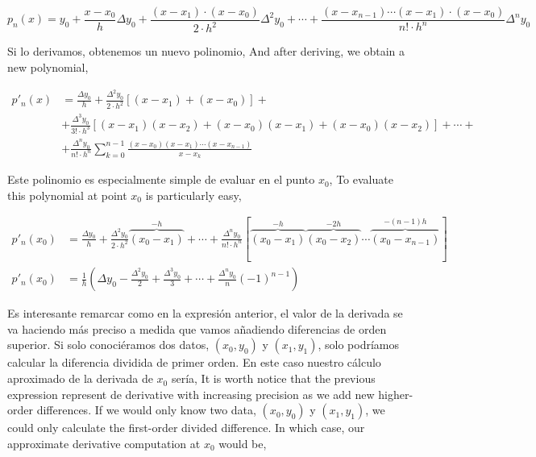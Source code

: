 \begin{equation*}
p_n(x)=y_0+\frac{x-x_0}{h}\Delta y_0+\frac{(x-x_1)\cdot (x-x_0)}{2\cdot h^2}\Delta^2 y_0+\cdots +\frac{(x-x_{n-1}) \cdots (x-x_1)\cdot (x-x_0)}{n! \cdot h^n}\Delta^n y_0
\end{equation*}
\begin{paracol}{2}
Si lo derivamos, obtenemos un nuevo polinomio,
\switchcolumn
And after deriving, we obtain a new polynomial,
\end{paracol}
\begin{align*}
p'_n(x)&=\frac{\Delta y_0}{h}+\frac{\Delta^2 y_0}{2\cdot h^2}\left[(x-x_1)+(x-x_0) \right] +\\
&+\frac{\Delta^3 y_0}{3! \cdot h^3}\left[(x-x_1)(x-x_2)+(x-x_0)(x-x_1)+(x-x_0)(x-x_2)\right]+\cdots +\\
&+\frac{\Delta^n y_0}{n! \cdot h^n}\sum_{k=0}^{n-1}\frac{(x-x_0)(x-x_1)\cdots (x-x_{n-1})}{x-x_k}
\end{align*}
\begin{paracol}{2}
Este polinomio es especialmente simple de evaluar en el punto $x_0$,
\switchcolumn
To evaluate this polynomial at point $x_0$ is particularly easy,
\end{paracol}
\begin{align*}
p'_n(x_0)&=\frac{\Delta y_0}{h}+\frac{\Delta^2 y_0}{2\cdot h^2}\overbrace{(x_0-x_1)}^{-h}+\cdots +
\frac{\Delta^n y_0}{n! \cdot h^n}[\overbrace{(x_0-x_1)}^{-h}\overbrace{(x_0-x_2)}^{-2h}\cdots \overbrace{(x_0-x_{n-1})}^{-(n-1)h}]\\
p'_n(x_0)&=\frac{1}{h}\left(\Delta y_0-\frac{\Delta^2 y_0}{2}+\frac{\Delta^3 y_0}{3}+\cdots +
\frac{\Delta^n y_0}{n}(-1)^{n-1}\right)
\end{align*}
\begin{paracol}{2}
Es interesante remarcar como en la expresión anterior, el valor de la derivada se va haciendo más preciso a medida que vamos añadiendo diferencias de orden superior. Si solo conociéramos dos datos, $(x_0, y_0)$ y $(x_1, y_1)$, solo podríamos calcular la diferencia dividida de primer orden. En este caso nuestro cálculo aproximado de la derivada de $x_0$ sería,
\switchcolumn
It is worth notice that the previous expression represent de derivative with increasing precision as we add new higher-order differences. If we would only know two data, $(x_0,y_0)$ y $(x_1,y_1)$, we could only calculate the first-order divided difference. In which case, our approximate derivative computation at $x_0$ would be,  

\end{paracol}
